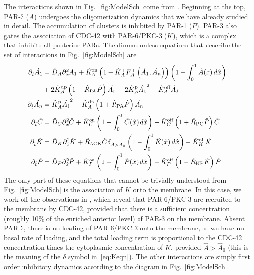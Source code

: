\documentclass[11pt]{article}
\newcommand{\6}[1]{#1_{\text{6}}}
\newcommand{\3}[1]{#1_{\text{3}}}
\newcommand{\A}[1]{#1_A}
\begin{document}
The interactions shown in Fig.\ \ref{fig:ModelSch} come from \cite[Fig.~2]{lang2017proteins}. Beginning at the top, PAR-3 ($A$) undergoes the oligomerization dynamics that we have already studied in detail. The accumulation of clusters is inhibited by PAR-1 ($P$). PAR-3 also gates the association of CDC-42 with PAR-6/PKC-3 ($K$), which is a complex that inhibits all posterior PARs. The dimensionless equations that describe the set of interactions in Fig.\ \ref{fig:ModelSch} are
\begin{subequations}
\label{eq:AllBC}
\begin{align}
\nonumber
\Dthat \hat{\MA} & = \DhatA \Dxhat^2 \MA +\KhatonA \left(1+\KhatfA \A{F}^+\left(\hat{\MA},\hat{\PA}\right)\right)\left(1 - \int_0^1 \hat{A}(x) \, d\hat{x} \right) \\ 
&+ 2\KhatdpA \left(1+\hat{R}_\text{PA}\hat{P}\right)\hat{\PA}-2\KhatpA \hat{\MA}^2 - \KhatoffA \hat{\MA} \\ 
\Dthat \hat{\PA} & =\KhatpA \hat{\MA}^2- \KhatdpA \left(1+\hat{R}_\text{PA}\hat{P}\right) \hat{\PA} \\ 
\label{eq:Ceqn}
\Dthat \hat{C}& =\DhatC \Dxhat^2 \hat{C} +\KhatonC \left(1 - \int_0^1 \hat{C}(\hat x) \, d\hat{x} \right)  - \KhatoffC \left(1+\hat{R}_\text{PC}\hat P\right)\hat{C}\\
\label{eq:Keqn}
\Dthat \hat{K}  &= \DhatK \Dxhat^2 \hat{K} + \hat{R}_\text{ACK} \hat{C} \delta_{\hat A > \hat A_0} \left(1 - \int_0^1 \hat{K}(\hat x) \, d\hat{x} \right)-\KhatoffK \hat{K} \\
\Dthat \hat{P} & =\DhatP \Dxhat^2 \hat{P} +\KhatonP \left(1 - \int_0^1 \hat{P}(\hat x) \, d\hat{x} \right)  - \KhatoffP \left(1+\hat{R}_\text{KP}\hat{K}\right)\hat{P}
\end{align}
\end{subequations}
The only part of these equations that cannot be trivially understood from Fig.\ \ref{fig:ModelSch} is the association of $K$ onto the membrane. In this case, we work off the observations in \cite{sailer2015dynamic}, which reveal that PAR-6/PKC-3 are recruited to the membrane by CDC-42, provided that there is a sufficient concentration (roughly 10\% of the enriched anterior level) of PAR-3 on the membrane. Absent PAR-3, there is no loading of PAR-6/PKC-3 onto the membrane, so we have no basal rate of loading, and the total loading term is proportional to the CDC-42 concentration times the cytoplasmic concentration of $K$, provided $\hat A > \hat A_0$ (this is the meaning of the $\delta$ symbol in\ \eqref{eq:Keqn}). The other interactions are simply first order inhibitory dynamics according to the diagram in Fig.\ \ref{fig:ModelSch}. 
\end{document}
